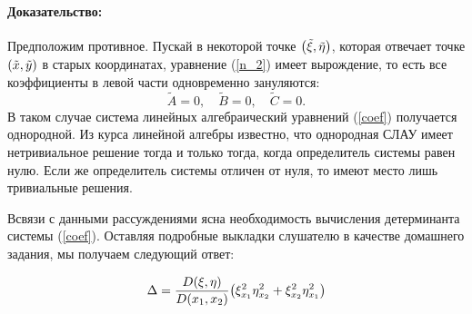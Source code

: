 \documentclass[a4paper,russian]{article}
\begin{document}
 \paragraph{Доказательство:}
Предположим противное. Пускай в некоторой точке $\qty(\tilde \xi, \tilde \eta)$, которая отвечает точке $\qty(\tilde x, \tilde y)$ в старых координатах, уравнение (\ref{n_2}) имеет вырождение, то есть все коэффициенты в левой части одновременно зануляются:
\begin{equation}\label{pu}
\tilde A = 0, \quad \tilde B = 0, \quad \tilde C = 0.
\end{equation}
В таком случае система линейных алгебраический уравнений (\ref{coef}) получается однородной. Из курса линейной алгебры \cite{en_lec_2} известно, что однородная СЛАУ имеет нетривиальное решение тогда и только тогда, когда определитель системы равен нулю. Если же определитель системы отличен от нуля, то имеют место лишь тривиальные решения. 
\par Всвязи с данными рассуждениями ясна необходимость вычисления детерминанта системы (\ref{coef}). Оставляя подробные выкладки слушателю в качестве домашнего задания, мы получаем следующий ответ:

\begin{equation}\label{det}
	\Delta = \frac{D\qty(\xi,\eta)}{D\qty(x_1,x_2)}\qty(\xi_{x_1}^2\eta_{x_2}^2+\xi_{x_2}^2\eta_{x_1}^2)
\end{equation}
\end{document}
